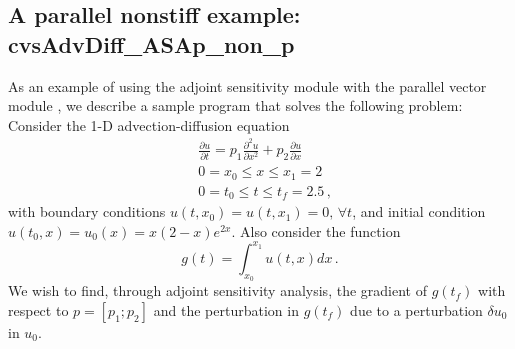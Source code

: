 
\newpage
\subsection{A parallel nonstiff example: cvsAdvDiff\_ASAp\_non\_p}
\label{ss:cvsAdvDiff_ASAp_non_p}

As an example of using the {\cvodes} adjoint sensitivity module with the
parallel vector module {\nvecp}, we describe a sample program that solves
the following problem:  Consider the 1-D advection-diffusion equation
\begin{equation}\label{e:cvsAdvDiff_ASAp_non_p:orig_pde}
  \begin{split}
    & \frac{\partial u}{\partial t} = p_1 \frac{\partial^2 u}{\partial x^2} 
    + p_2 \frac{\partial u}{\partial x} \\
    & 0 = x_0 \le x \le x_1 = 2 \\
    & 0 = t_0 \le t \le t_f = 2.5 \, ,
  \end{split}
\end{equation}
with boundary conditions $u(t,x_0) = u(t,x_1) = 0 ,\, \forall t$,
and initial condition $u(t_0 , x) = u_0(x) = x(2-x)e^{2x}$. Also
consider the function
\begin{equation*}
  g(t) = \int_{x_0}^{x_1} u(t,x) dx \, .
\end{equation*}
We wish to find, through adjoint sensitivity analysis, the gradient of
$g(t_f)$ with respect to $p = [p_1 ; p_2]$ and the perturbation in $g(t_f)$
due to a perturbation $\delta u_0$ in $u_0$.

